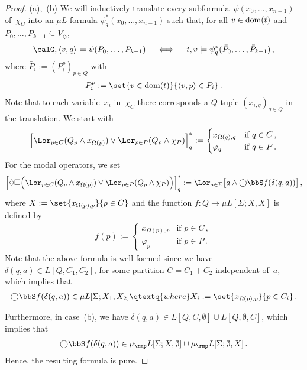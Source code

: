 \documentclass[10pt, fleqn]{scrartcl}
\DeclareRobustCommand*{\dom}{\qopname\relax o{dom}}
\newcommand*{\mup}{\mu_\rmp}
\newcommand*{\?}{\kern .08em}
\newcommand\medcircle{\bigcirc}
\begin{document}
\begin{proof}
(a),~(b)
We will inductively translate every subformula~$\psi(x_0,\dots,x_{n-1})$ of~$\chi_C$ into an
$\mu L$-formula $\psi^*_q(\bar x_0,\dots,\bar x_{n-1})$ such that, for all $v \in \dom(t)$ and
$P_0,\dots,P_{k-1} \subseteq V_\Diamond$,
\begin{align*}
  \calG,\langle v,q\rangle \models \psi(P_0,\dots,P_{k-1})
  \quad\iff\quad
  t,v \models \psi^*_q(\bar P_0,\dots,\bar P_{k-1})\,,
\end{align*}
where $\bar P_i := (P_i^p)_{p \in Q}$ with
\begin{align*}
  P_i^p := \set{ v \in \dom(t) }{ \langle v,p\rangle \in P_i }\,.
\end{align*}
Note that to each variable~$x_i$ in~$\chi_C$ there corresponds
a $Q$-tuple $(x_{i,q})_{q \in Q}$ in the translation.
We start with
\begin{align*}
  \Bigl[\Lor_{p \in C}(Q_p \land x_{\Omega(p)}) \lor
          \Lor_{p \in P} (Q_p \land \chi_P)\Bigr]^*_q
    := \begin{cases}
         x_{\Omega(q),q} &\text{if } q \in C\,, \\
         \varphi_q       &\text{if } q \in P\,.
       \end{cases}
\end{align*}
For the modal operators, we set
\begin{align*}
  \Bigl[{\Diamond}{\Box}\Bigl(\Lor_{p \in C}(Q_p \land x_{\Omega(p)}) \lor
          \Lor_{p \in P} (Q_p \land \chi_P)\Bigr)\Bigr]^*_q
    := \Lor_{a \in \Sigma}
         \bigl[a \land {\medcircle}\bbS f(\delta(q,a))\bigr]\,,
\end{align*}
where $X := \set{ x_{\Omega(p),p} }{ p \in C }$
and the function $f : Q \to \mu L[\Sigma;X,X]$ is defined by
\begin{align*}
  f(p) := \begin{cases}
            x_{\Omega(p),p} &\text{if } p \in C\,, \\
            \varphi_p       &\text{if } p \in P\,.
          \end{cases}
\end{align*}
Note that the above formula is well-formed since we have $\delta(q,a) \in L[Q,C_1,C_2]$,
for some partition $C = C_1 + C_2$ independent of~$a$, which implies that
\begin{align*}
  {\medcircle}\bbS f(\delta(q,a)) \in \mu L[\Sigma;X_1,X_2]
  \qtextq{where}
  X_i := \set{ x_{\Omega(p),p} }{ p \in C_i }\,.
\end{align*}

Furthermore, in case~(b), we have
$\delta(q,a) \in L[Q,C,\emptyset] \cup L[Q,\emptyset,C]$, which implies that
\begin{align*}
  {\medcircle}\bbS f(\delta(q,a)) \in
    \mup L[\Sigma;X,\emptyset] \cup \mup L[\Sigma;\emptyset,X]\,.
\end{align*}
Hence, the resulting formula is pure.


\end{proof}
\end{document}
